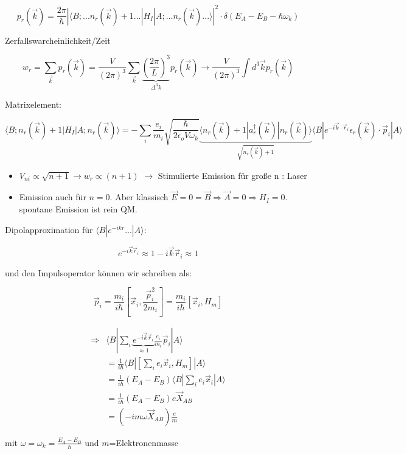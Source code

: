 \[p_r(\vec k) = \frac{2\pi}{\hbar}|\langle B;...n_r(\vec k)+1...|H_I|A;...n_r(\vec k)...\rangle |^2\cdot\delta(E_A-E_B-\hbar\omega_k)\]

Zerfallswarcheinlichkeit/Zeit

\[w_r = \sum_{\vec k}p_r(\vec k) = \frac{V}{(2\pi)^3}\sum_{\vec k}\underbrace{(\frac{2\pi}{L})^3}_{\Delta^3k}p_r(\vec k)\rightarrow \frac{V}{(2\pi)^3}\int d^3\vec k p_r(\vec k)\]

Matrixelement:

\[\langle B;n_r(\vec k) +1 |H_I|A;n_r(\vec k)\rangle = -\sum_i \frac{e_i}{m_i}\sqrt{\frac{\hbar}{2\epsilon_o V\omega_k}}\underbrace{\langle n_r(\vec k) +1 |a^\dagger_r(\vec k)|n_r(\vec k)\rangle }_{\sqrt{n_r(\vec k)+1}} \langle B|e^{-i\vec k\cdot\vec r_i}\epsilon_r(\vec k)\cdot \vec p_i|A\rangle \]


\begin{itemize}
\item \(V_{ni}\propto \sqrt{n+1} \rightarrow w_r\propto (n+1)\)
\(\rightarrow \) Stimulierte Emission für große n : Laser

\item Emission auch für \(n=0\). Aber klassisch \(\vec E = 0=\vec B \Rightarrow \vec A=0\Rightarrow H_I=0\). spontane Emission ist rein QM.

\end{itemize}


Dipolapproximation für \(\langle B|e^{-ikr}...|A\rangle \):

\[e^{-i\vec k\vec r_i}\approx 1-i\vec k\vec r_i\approx 1\]

und den Impulsoperator können wir schreiben als:

\[\vec p_i = \frac{m_i}{i\hbar} [\vec x_i,\frac{\vec p_i^2}{2m_i}] = \frac{m_i}{i\hbar} [\vec x_i,H_m]  \]


\begin{align}
\Rightarrow &\langle B|\sum_i \underbrace{e^{-i\vec k\vec r_i}}_{\approx 1} \frac{e_i}{m_i}\vec p_i|A\rangle \\
&=\frac{1}{i\hbar} \langle B|[\sum_i e_i \vec x_i,H_m] |A\rangle \\
&=\frac{1}{i\hbar} (E_A-E_B) \langle B|\sum_i e_i\vec x_i|A\rangle\\
&=\frac{1}{i\hbar} (E_A-E_B) e\vec X_{AB}\\
&= (-im\omega \vec X_{AB})\frac{e}{m}
\end{align}


mit \(\omega = \omega_k = \frac{E_A-E_B}{\hbar}\) und \(m\)=Elektronenmasse


